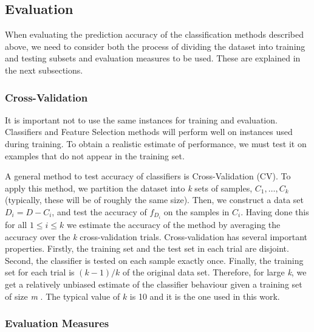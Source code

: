 \documentclass{elsart}
\begin{document}


\subsection{Evaluation}
\label{subsec:eval}

When evaluating the prediction accuracy of the classification methods described above, we need to consider both the process of
dividing the dataset into training and testing subsets and evaluation measures to be used. These are explained in the next subsections.


\subsubsection{Cross-Validation}

It is important not to use the same instances for training and evaluation. Classifiers and Feature Selection methods will perform
well on instances used during training. To obtain a realistic estimate of performance, we must test it on examples that do not
appear in the training set.

A general method to test accuracy of classifiers is Cross-Validation (CV). To apply this method, we partition the dataset into \emph{k} sets of samples, $C_{1},\ldots,C_{k}$ (typically, these will be of roughly the same size). Then, we construct a data set
$D_{i}=D-C_{i}$, and test the accuracy of $f_{D_{i}}$ on the samples in $C_{i}$. Having done this for all $1\leq i \leq k$ we estimate the accuracy of the method by averaging the accuracy over the \emph{k} cross-validation trials. Cross-validation has several important properties. Firstly, the training set and the test set in each trial are disjoint. Second, the classifier is tested on each sample exactly once. Finally, the training set for each trial is $(k-1)/k$ of the original data set. Therefore, for large \emph{k}, we get a relatively unbiased estimate of the classifier behaviour given a training set of size \emph{m} \cite{KJ95}. The typical value of $k$ is 10 and it is the one used in this work.



\subsubsection{Evaluation Measures}
\end{document}
